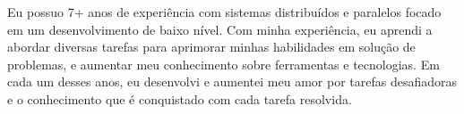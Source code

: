 

\begin{cvparagraph}

    Eu possuo 7+ anos de experiência com sistemas distribuídos e paralelos
    focado em um desenvolvimento de baixo nível. Com minha experiência, eu
    aprendi a abordar diversas tarefas para aprimorar minhas habilidades em
    solução de problemas, e aumentar meu conhecimento sobre ferramentas e
    tecnologias. Em cada um desses anos, eu desenvolvi e aumentei meu amor por
    tarefas desafiadoras e o conhecimento que é conquistado com cada tarefa
    resolvida.

\end{cvparagraph}
